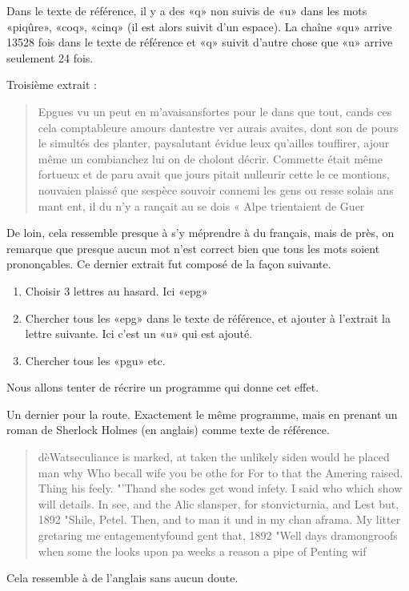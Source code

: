 \begin{remark}
Dans le texte de référence, il y a des «q» non suivis de «u» dans les mots «piqûre», «coq», «cinq» (il est alors suivit d'un espace). La chaîne «qu» arrive 13528 fois dans le texte de référence et «q» suivit d'autre chose que «u» arrive seulement 24 fois.
\end{remark}

Troisième extrait :
\begin{quote}
Epgues vu un peut en m'avaisansfortes pour le dans que tout, cands ces cela comptableure amours dantestre ver aurais avaites, dont son de pours le simultés des planter, paysalutant évidue leux qu'ailles touffirer, ajour même un combianchez lui on de cholont décrir. Commette était même fortueux et de paru avait que jours pitait nulleurir cette le ce montions, nouvaien plaissé que sespèce souvoir connemi les gens ou resse solais ans mant ent, il du n'y a rançait au se dois « Alpe trientaient de Guer
\end{quote}
De loin, cela ressemble presque à s'y méprendre à du français, mais de près, on remarque que presque aucun mot n'est correct bien que tous les mots soient prononçables. Ce dernier extrait fut composé de la façon suivante.

\begin{enumerate}
    \item
        Choisir 3 lettres au hasard. Ici «epg» 
    \item
        Chercher tous les «epg» dans le texte de référence, et ajouter à l'extrait la lettre suivante. Ici c'est un «u» qui est ajouté.
    \item
        Chercher tous les «pgu» etc.
\end{enumerate}

Nous allons tenter de récrire un programme qui donne cet effet.


Un dernier pour la route. Exactement le même programme, mais en prenant un roman de Sherlock Holmes (en anglais) comme texte de référence.
\begin{quote}
dèWatseculiance is marked, at taken the unlikely siden would he placed man why Who becall wife you be othe for For to that the Amering raised. Thing his feely. "'Thand she sodes get wond infety. I said who which show will details. In see, and the Alic slansper, for stonvicturnia, and Lest but, 1892 "Shile, Petel. Then, and to man it und in my chan aframa. My litter gretaring me entagementyfound gent that, 1892 "Well days dramongroofs when some the looks upon pa weeks a reason a pipe of Penting wif
\end{quote}
Cela ressemble à de l'anglais sans aucun doute.

